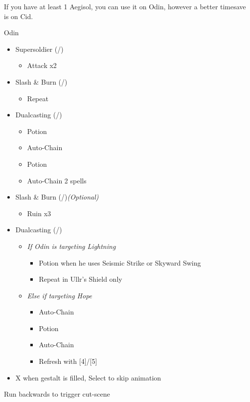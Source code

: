 \begin{multicols}{2}
	\renewcommand{\first}{[1] Slash \& Burn (\com/\rav)}
	\renewcommand{\second}{[2] Supersoldier (\com/\syn)}
	\renewcommand{\fourth}{[4] Dualcasting (\rav/\rav)}
	\renewcommand{\fifth}{[5] Dualcasting (\rav/\rav)}
	If you have at least 1 Aegisol, you can use it on Odin, however a better timesave is on Cid.
	\vfill
	\begin{battle}[0:52]{Odin}
		\begin{itemize}
			\item \second
			      \begin{itemize}
				      \item Attack x2
			      \end{itemize}
			\item \first
				\begin{itemize}
					\item Repeat
				\end{itemize}
			\item \fourth
			      \begin{itemize}
				      \item Potion
				      \item Auto-Chain
				      \item Potion
				      \item Auto-Chain 2 spells
			      \end{itemize}
			\item \first \textit{(Optional)}
			      \begin{itemize}
				      \item Ruin x3
			      \end{itemize}
			      \columnbreak
			\item \fifth
			      \begin{itemize}
				      \item \textit{If Odin is targeting Lightning}
				            \begin{itemize}
					            \item Potion when he uses Seismic Strike or Skyward Swing
					            \item Repeat in Ullr's Shield only
				            \end{itemize}
				      \item \textit{Else if targeting Hope}
				            \begin{itemize}
					            \item Auto-Chain
					            \item Potion
					            \item Auto-Chain
					            \item Refresh with [4]/[5]
				            \end{itemize}
			      \end{itemize}
			\item X when gestalt is filled, Select to skip animation
		\end{itemize}
	\end{battle}
	Run backwards to trigger cut-scene
	

\end{multicols}
